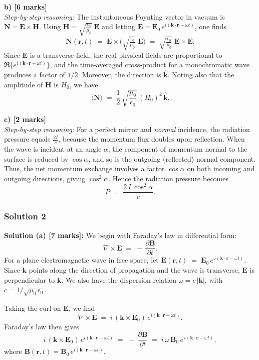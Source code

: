 \documentclass{article}
\begin{document}
\textbf{b) [6 marks]}\\
\textit{Step-by-step reasoning:} 
The instantaneous Poynting vector in vacuum is 
\(\mathbf{N} = \mathbf{E}\times\mathbf{H}\).  
Using \(\mathbf{H} = \sqrt{\frac{\epsilon_0}{\mu_0}}\;\mathbf{E}\) and letting 
\(\mathbf{E} = \mathbf{E}_0\,e^{i(\mathbf{k}\cdot \mathbf{r}-\omega t)}\), 
one finds
\[
\mathbf{N}(\mathbf{r},t) 
\;=\; \mathbf{E}\times\bigl(\sqrt{\tfrac{\epsilon_0}{\mu_0}}\;\mathbf{E}\bigr)
\;=\; \sqrt{\tfrac{\epsilon_0}{\mu_0}}\;\mathbf{E}\times\mathbf{E}.
\]
Since \(\mathbf{E}\) is a transverse field, the real physical fields are proportional to 
\(\Re\{e^{i(\mathbf{k}\cdot \mathbf{r}-\omega t)}\}\), and the time-averaged cross-product 
for a monochromatic wave produces a factor of \(1/2\). Moreover, the direction is \(\hat{\mathbf{k}}\). 
Noting also that the amplitude of \(\mathbf{H}\) is \(H_0\), we have 
\[
\langle \mathbf{N}\rangle 
\;=\; \frac{1}{2}\,\sqrt{\frac{\mu_0}{\epsilon_0}}\,(H_0)^2\,\hat{\mathbf{k}}.
\]

\textbf{c) [2 marks]}\\
\textit{Step-by-step reasoning:} 
For a perfect mirror and \emph{normal} incidence, the radiation pressure equals 
\(\tfrac{2I}{c}\), because the momentum flux doubles upon reflection.  
When the wave is incident at an angle \(\alpha\), the component of momentum normal 
to the surface is reduced by \(\cos\alpha\), and so is the outgoing (reflected) normal component.  
Thus, the net momentum exchange involves a factor \(\cos\alpha\) on both incoming 
and outgoing directions, giving \(\cos^2 \alpha\). Hence the radiation pressure becomes
\[
P 
\;=\; \frac{2\,I\,\cos^2\alpha}{c}.
\]

\subsubsection{Solution 2}
\textbf{Solution (a) [7 marks]:} 
We begin with Faraday's law in differential form:
\[
\nabla \times \mathbf{E} \;=\; -\,\frac{\partial \mathbf{B}}{\partial t}.
\]
For a plane electromagnetic wave in free space, let 
\(
\mathbf{E}(\mathbf{r}, t) \;=\; \mathbf{E}_0 \,e^{\,i(\mathbf{k}\cdot\mathbf{r}-\omega t)}.
\)
Since \(\mathbf{k}\) points along the direction of propagation and the wave is transverse, 
\(\mathbf{E}\) is perpendicular to \(\mathbf{k}\). We also have the dispersion relation 
\(\omega = c\,|\mathbf{k}|\), with \(c = 1/\sqrt{\mu_0\,\epsilon_0}\). 

Taking the curl on \(\mathbf{E}\), we find
\[
\nabla \times \mathbf{E}
\;=\;
i\,(\mathbf{k}\times \mathbf{E}_0)\,
e^{i(\mathbf{k}\cdot\mathbf{r}-\omega t)}.
\]
Faraday's law then gives 
\[
i\,(\mathbf{k}\times \mathbf{E}_0)\,
e^{i(\mathbf{k}\cdot\mathbf{r}-\omega t)}
\;=\;
-\;\frac{\partial \mathbf{B}}{\partial t}
\;=\;
i\,\omega\,\mathbf{B}_0\,
e^{\,i(\mathbf{k}\cdot\mathbf{r}-\omega t)},
\]
where \(\mathbf{B}(\mathbf{r}, t) = \mathbf{B}_0\,e^{i(\mathbf{k}\cdot\mathbf{r}-\omega t)}.\)
\end{document}
